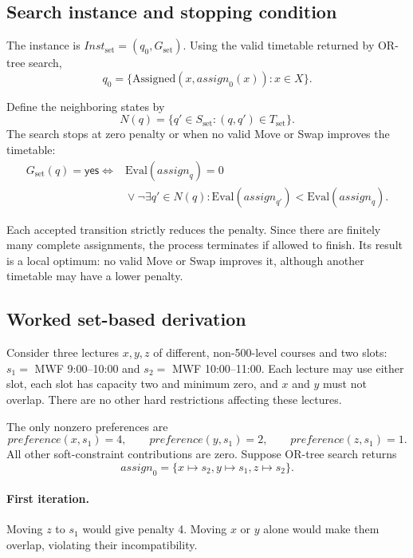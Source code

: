 \subsection{Search instance and stopping condition}
\label{sec:set-instance}

The instance is
$\mathit{Inst}_{\mathrm{set}}=(q_0,G_{\mathrm{set}})$.
Using the valid timetable returned by OR-tree search,
\[
q_0=
\{\mathrm{Assigned}(x,\mathit{assign}_0(x)):x\in X\}.
\]

Define the neighboring states by
\[
N(q)=\{q'\in S_{\mathrm{set}}:(q,q')\in T_{\mathrm{set}}\}.
\]
The search stops at zero penalty or when no valid Move
or Swap improves the timetable:
\[
\begin{aligned}
G_{\mathrm{set}}(q)=\mathsf{yes}\iff{}&
\mathrm{Eval}(\mathit{assign}_q)=0\\
&{}\lor
\neg\exists q'\in N(q):
\mathrm{Eval}(\mathit{assign}_{q'})
<
\mathrm{Eval}(\mathit{assign}_q).
\end{aligned}
\]

Each accepted transition strictly reduces the penalty.
Since there are finitely many complete assignments, the
process terminates if allowed to finish. Its result is a
local optimum: no valid Move or Swap improves it, although
another timetable may have a lower penalty.

\subsection{Worked set-based derivation}
\label{sec:set-example}

Consider three lectures $x,y,z$ of different, non-500-level
courses and two slots: $s_1=$ MWF 9:00--10:00 and
$s_2=$ MWF 10:00--11:00. Each lecture may use either slot,
each slot has capacity two and minimum zero, and $x$ and
$y$ must not overlap. There are no other hard restrictions
affecting these lectures.

The only nonzero preferences are
\[
\mathit{preference}(x,s_1)=4,\qquad
\mathit{preference}(y,s_1)=2,\qquad
\mathit{preference}(z,s_1)=1.
\]
All other soft-constraint contributions are zero.
Suppose OR-tree search returns
\[
\mathit{assign}_0
=\{x\mapsto s_2,y\mapsto s_1,z\mapsto s_2\}.
\]

\paragraph{First iteration.}
Moving $z$ to $s_1$ would give penalty 4.
Moving $x$ or $y$ alone would make them overlap,
violating their incompatibility.


